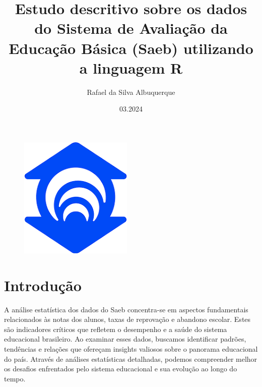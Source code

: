 \documentclass[17pt]{extarticle}
\title{Estudo descritivo sobre os dados do Sistema de Avaliação da Educação Básica (Saeb) utilizando a linguagem R}
\author{Rafael da Silva Albuquerque}
\date{03.2024}
\begin{document}
\begin{figure}[t]
    \centering
    \includegraphics[width=0.5\linewidth]{doc/unifor-logo.png}
    \label{fig:my_label}
\end{figure}
\maketitle

\newpage
\section{Introdução}
A análise estatística dos dados do Saeb concentra-se em aspectos fundamentais relacionados às notas dos alunos, taxas de reprovação e abandono escolar. Estes são indicadores críticos que refletem o desempenho e a saúde do sistema educacional brasileiro. Ao examinar esses dados, buscamos identificar padrões, tendências e relações que ofereçam insights valiosos sobre o panorama educacional do país. Através de análises estatísticas detalhadas, podemos compreender melhor os desafios enfrentados pelo sistema educacional e sua evolução ao longo do tempo.

\newpage
\end{document}
